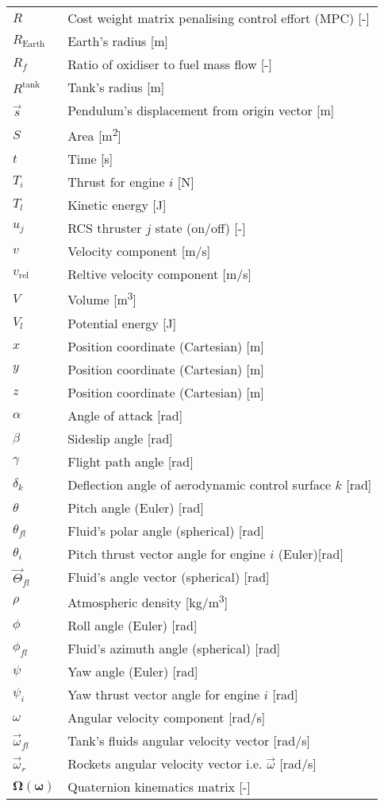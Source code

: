 \begin{longtable}{p{2.5cm}p{12cm}}
    $R$ & Cost weight matrix penalising control effort (MPC) [-] \\
    $R_{\text{Earth}}$ & Earth's radius [m] \\
    $R_f$ & Ratio of oxidiser to fuel mass flow [-] \\
    $R^{\text{tank}}$ & Tank's radius [m] \\
    $\vec{s}$ & Pendulum's displacement from origin vector [m] \\
    $S$ & Area [m\textsuperscript{2}] \\
    $t$ & Time [s] \\
    $T_i$ & Thrust for engine $i$ [N] \\
    $T_l$ & Kinetic energy [J] \\
    $u_j$ & RCS thruster $j$ state (on/off) [-] \\
    $v$ & Velocity component [m/s] \\
    $v_{\text{rel}}$ & Reltive velocity component [m/s] \\
    $V$ & Volume [m\textsuperscript{3}] \\
    $V_l$ & Potential energy [J] \\
    $x$ & Position coordinate (Cartesian) [m] \\
    $y$ & Position coordinate (Cartesian) [m] \\
    $z$ & Position coordinate (Cartesian) [m] \\
    \midrule
    $\alpha$ & Angle of attack [rad] \\
    $\beta$ & Sideslip angle [rad] \\
    $\gamma$ & Flight path angle [rad] \\
    $\delta_k$ & Deflection angle of aerodynamic control surface $k$ [rad] \\
    $\theta$ & Pitch angle (Euler) [rad] \\
    $\theta_{fl}$ & Fluid's polar angle (spherical) [rad] \\
    $\theta_i$ & Pitch thrust vector angle for engine $i$ (Euler)[rad] \\
    $\vec{\Theta}_{fl}$ & Fluid's angle vector (spherical) [rad] \\
    $\rho$ & Atmospheric density [kg/m\textsuperscript{3}] \\
    $\phi$ & Roll angle (Euler) [rad] \\
    $\phi_{fl}$ & Fluid's azimuth angle  (spherical) [rad] \\
    $\psi$ & Yaw angle (Euler) [rad] \\
    $\psi_i$ &  Yaw thrust vector angle for engine $i$ [rad] \\
    $\omega$ & Angular velocity component [rad/s] \\
    $\vec{\omega}_{fl}$ & Tank's fluids angular velocity vector [rad/s] \\
    $\vec{\omega}_{r}$ & Rockets angular velocity vector i.e. \(\vec{\omega}\) [rad/s] \\
    $\mathbf{\Omega(\omega)}$ & Quaternion kinematics matrix [-] \\
    \bottomrule
\end{longtable}
